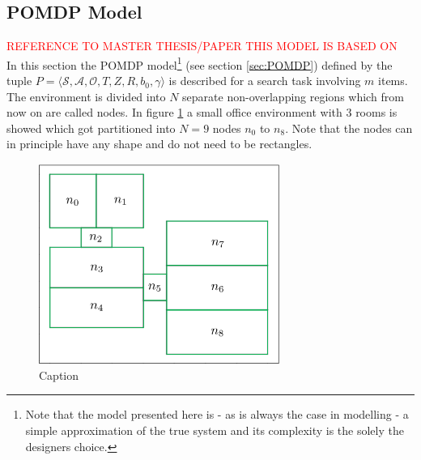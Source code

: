 \subsection{POMDP Model}
\textcolor{red}{REFERENCE TO MASTER THESIS/PAPER THIS MODEL IS BASED ON}\\
In this section the POMDP model\footnote{Note that the model presented here is - as is always the case in modelling - a simple approximation of the true system and its complexity is the solely the designers choice.} (see section \ref{sec:POMDP}) defined by the tuple $P = \langle \mathcal{S}, \mathcal{A}, \mathcal{O}, T, Z, R, b_0, \gamma \rangle$ is described for a search task involving $m$ items. The environment is divided into $N$ separate non-overlapping regions which from now on are called nodes. In figure \ref{fig:nodes} a small office environment with 3 rooms is showed which got partitioned into $N=9$ nodes $n_0$ to $n_8$. Note that the nodes can in principle have any shape and do not need to be rectangles.
\begin{figure}
    \centering
    \includegraphics[width=0.7\textwidth]{Report/images/envsmall_l2.png}
    \caption{Caption}
    \label{fig:nodes}
\end{figure}
